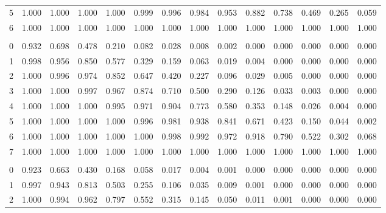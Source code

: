 \documentclass[
]{article}
\begin{document}
\begin{longtable}[t]{lrrrrrrrrrrrrr}
\hspace{1em}5 & 1.000 & 1.000 & 1.000 & 1.000 & 0.999 & 0.996 & 0.984 & 0.953 & 0.882 & 0.738 & 0.469 & 0.265 & 0.059\\
\hspace{1em}6 & 1.000 & 1.000 & 1.000 & 1.000 & 1.000 & 1.000 & 1.000 & 1.000 & 1.000 & 1.000 & 1.000 & 1.000 & 1.000\\
\addlinespace[0.3em]
\multicolumn{14}{l}{$n=7$}\\
\hspace{1em}0 & 0.932 & 0.698 & 0.478 & 0.210 & 0.082 & 0.028 & 0.008 & 0.002 & 0.000 & 0.000 & 0.000 & 0.000 & 0.000\\
\hspace{1em}1 & 0.998 & 0.956 & 0.850 & 0.577 & 0.329 & 0.159 & 0.063 & 0.019 & 0.004 & 0.000 & 0.000 & 0.000 & 0.000\\
\hspace{1em}2 & 1.000 & 0.996 & 0.974 & 0.852 & 0.647 & 0.420 & 0.227 & 0.096 & 0.029 & 0.005 & 0.000 & 0.000 & 0.000\\
\hspace{1em}3 & 1.000 & 1.000 & 0.997 & 0.967 & 0.874 & 0.710 & 0.500 & 0.290 & 0.126 & 0.033 & 0.003 & 0.000 & 0.000\\
\hspace{1em}4 & 1.000 & 1.000 & 1.000 & 0.995 & 0.971 & 0.904 & 0.773 & 0.580 & 0.353 & 0.148 & 0.026 & 0.004 & 0.000\\
\hspace{1em}5 & 1.000 & 1.000 & 1.000 & 1.000 & 0.996 & 0.981 & 0.938 & 0.841 & 0.671 & 0.423 & 0.150 & 0.044 & 0.002\\
\hspace{1em}6 & 1.000 & 1.000 & 1.000 & 1.000 & 1.000 & 0.998 & 0.992 & 0.972 & 0.918 & 0.790 & 0.522 & 0.302 & 0.068\\
\hspace{1em}7 & 1.000 & 1.000 & 1.000 & 1.000 & 1.000 & 1.000 & 1.000 & 1.000 & 1.000 & 1.000 & 1.000 & 1.000 & 1.000\\
\addlinespace[0.3em]
\multicolumn{14}{l}{$n=8$}\\
\hspace{1em}0 & 0.923 & 0.663 & 0.430 & 0.168 & 0.058 & 0.017 & 0.004 & 0.001 & 0.000 & 0.000 & 0.000 & 0.000 & 0.000\\
\hspace{1em}1 & 0.997 & 0.943 & 0.813 & 0.503 & 0.255 & 0.106 & 0.035 & 0.009 & 0.001 & 0.000 & 0.000 & 0.000 & 0.000\\
\hspace{1em}2 & 1.000 & 0.994 & 0.962 & 0.797 & 0.552 & 0.315 & 0.145 & 0.050 & 0.011 & 0.001 & 0.000 & 0.000 & 0.000\\

\end{longtable}
\end{document}
